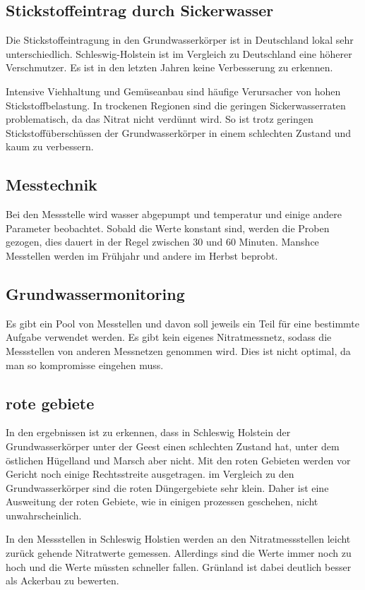 \documentclass[11pt]{scrbook}
\begin{document}
\subsection{Stickstoffeintrag durch Sickerwasser}
Die Stickstoffeintragung in den Grundwasserkörper ist in Deutschland lokal sehr unterschiedlich.
Schleswig-Holstein ist im Vergleich zu Deutschland eine höherer Verschmutzer.
Es ist in den letzten Jahren keine Verbesserung zu erkennen.

Intensive Viehhaltung und Gemüseanbau sind häufige Verursacher von hohen Stickstoffbelastung.
In trockenen Regionen sind die geringen Sickerwasserraten problematisch, da das Nitrat nicht verdünnt wird.
So ist trotz geringen Stickstoffüberschüssen der Grundwasserkörper in einem schlechten Zustand und kaum zu verbessern.

\subsection{Messtechnik}
Bei den Messstelle wird wasser abgepumpt und temperatur und einige andere Parameter beobachtet.
Sobald die Werte konstant sind, werden die Proben gezogen, dies dauert in der Regel zwischen 30 und 60 Minuten.
Manshce Messtellen werden im Frühjahr und andere im Herbst beprobt.

\subsection{Grundwassermonitoring}
Es gibt ein Pool von Messtellen und davon soll jeweils ein Teil für eine bestimmte Aufgabe verwendet werden.
Es gibt kein eigenes Nitratmessnetz, sodass die Messstellen von anderen Messnetzen genommen wird.
Dies ist nicht optimal, da man so kompromisse eingehen muss.

\subsection{rote gebiete}
In den ergebnissen ist zu erkennen, dass in Schleswig Holstein der Grundwasserkörper unter der Geest einen schlechten Zustand hat, unter dem östlichen Hügelland und Marsch aber nicht.
Mit den roten Gebieten werden vor Gericht noch einige Rechtsstreite ausgetragen.
im Vergleich zu den Grundwasserkörper sind die roten Düngergebiete sehr klein.
Daher ist eine Ausweitung der roten Gebiete, wie in einigen prozessen geschehen, nicht unwahrscheinlich.

In den Messstellen in Schleswig Holstien werden an den Nitratmessstellen leicht zurück gehende Nitratwerte gemessen.
Allerdings sind die Werte immer noch zu hoch und die Werte müssten schneller fallen.
Grünland ist dabei deutlich besser als Ackerbau zu bewerten.
\end{document}
